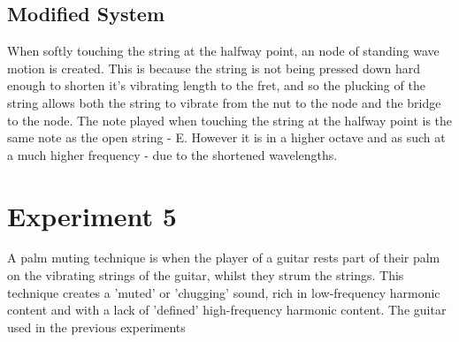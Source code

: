 \documentclass[11pt]{article}
\begin{document}
        \subsection{Modified System}
            When softly touching the string at the halfway point, an node of standing wave motion is created.
            This is because the string is not being pressed down hard enough to shorten it's vibrating length to the fret, and so the plucking of the string allows both the string to vibrate from the nut to the node and the bridge to the node.
            The note played when touching the string at the halfway point is the same note as the open string - E.
            However it is in a higher octave and as such at a much higher frequency - due to the shortened wavelengths.

    \section{Experiment 5} 
        A palm muting technique is when the player of a guitar rests part of their palm on the vibrating strings of the guitar, whilst they strum the strings.
        This technique creates a 'muted' or 'chugging' sound, rich in low-frequency harmonic content and with a lack of 'defined' high-frequency harmonic content.
        The guitar used in the previous experiments
        
\end{document}
